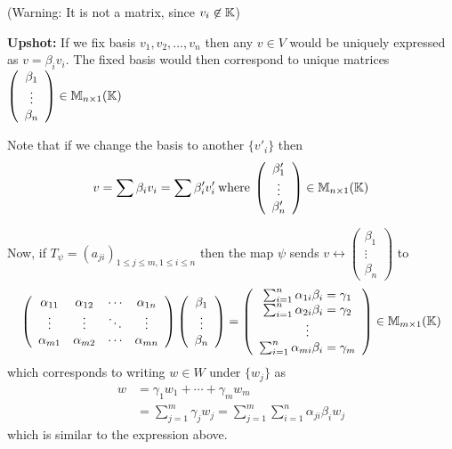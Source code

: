 (Warning: It is not a matrix, since \(v_i \not \in \mathbb{K}\))

\textbf{Upshot:} If we fix basis \(v_1, v_2, \dots, v_n\) then any \(v \in V\) would be uniquely expressed as \(v = \beta_i v_i\). The fixed basis would then correspond to unique matrices \(\left(\begin{array}{c}
        \beta_1 \\ \vdots \\ \beta_n
    \end{array}\right) \in \mathbb{M}_{n \times 1}(\mathbb{K})\)

Note that if we change the basis to another \(\{v'_i\}\) then \[
    v = \sum \beta_i v_i = \sum \beta'_i v'_i \:\text{where}\:  \left(\begin{array}{c}
            \beta'_1 \\ \vdots \\ \beta'_n
        \end{array}\right) \in \mathbb{M}_{n \times 1}(\mathbb{K})
\]

Now, if \(T_\psi = (a_{ji})_{1 \leq j \leq m, 1 \leq i \leq n}\) then the map \(\psi\) sends \(v \leftrightarrow \left(\begin{array}{c}
        \beta_1 \\ \vdots \\ \beta_n
    \end{array}\right)\) to
\[
    \left(\begin{array}{cccc}
            \alpha_{11} & \alpha_{12} & \cdots & \alpha_{1n} \\
            \vdots      & \vdots      & \ddots & \vdots      \\
            \alpha_{m1} & \alpha_{m2} & \cdots & \alpha_{mn}
        \end{array}\right)
    \left(\begin{array}{c}
            \beta_1 \\ \vdots \\ \beta_n
        \end{array}\right) = \left(\begin{array}{c}
            \sum_{i=1}^{n}\alpha_{1i}\beta_i = \gamma_1 \\
            \sum_{i=1}^{n}\alpha_{2i}\beta_i = \gamma_2 \\
            \vdots                                      \\
            \sum_{i=1}^{n}\alpha_{mi}\beta_i = \gamma_m \\
        \end{array}\right) \in \mathbb{M}_{m \times 1}(\mathbb{K})
\]
which corresponds to writing \(w \in W\) under \(\{w_j\}\) as \begin{align*}
    w & = \gamma_1 w_1 + \cdots + \gamma_m w_m                                              \\
      & = \sum_{j=1}^{m}\gamma_j w_j = \sum_{j=1}^{m} \sum_{i=1}^{n} \alpha_{ji}\beta_i w_j
\end{align*}
which is similar to the expression above.

